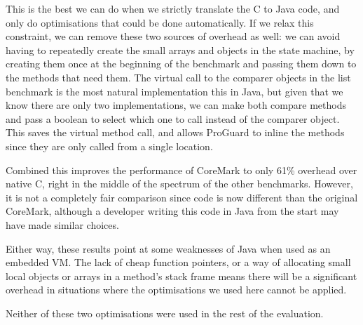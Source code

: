 This is the best we can do when we strictly translate the C to Java code, and only do optimisations that could be done automatically. If we relax this constraint, we can remove these two sources of overhead as well: we can avoid having to repeatedly create the small arrays and objects in the state machine, by creating them once at the beginning of the benchmark and passing them down to the methods that need them. The virtual call to the comparer objects in the list benchmark is the most natural implementation this in Java, but given that we know there are only two implementations, we can make both compare methods  and pass a boolean to select which one to call instead of the comparer object. This saves the virtual method call, and allows ProGuard to inline the methods since they are only called from a single location.

Combined this improves the performance of CoreMark to only 61\% overhead over native C, right in the middle of the spectrum of the other benchmarks. However, it is not a completely fair comparison since code is now different than the original CoreMark, although a developer writing this code in Java from the start may have made similar choices.

Either way, these results point at some weaknesses of Java when used as an embedded VM. The lack of cheap function pointers, or a way of allocating small local objects or arrays in a method's stack frame means there will be a significant overhead in situations where the optimisations we used here cannot be applied.

Neither of these two optimisations were used in the rest of the evaluation.


















